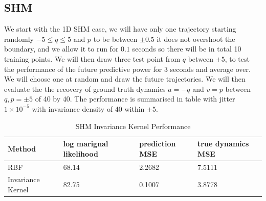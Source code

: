 \documentclass{statsmsc}
\begin{document}
\subsection{SHM}
We start with the 1D SHM case, we will have only one trajectory starting randomly $-5\le q\le5$ and $p$ to be between $\pm 0.5$ it does not overshoot the boundary, and we allow it to run for $0.1$ seconds so there will be in total 10 training points. 
We will then draw three test point from $q$ between $\pm 5$, to test the performance of the future predictive power for 3 seconds and average over. 
We will choose one at random and draw the future trajectories.
We will then evaluate the the recovery of ground truth dynamics $a=-q$ and $v=p$ between $q, p=\pm 5$ of 40 by 40.
The performance is summarised in table with jitter $1\times 10^{-5}$ with invariance density of 40 within $\pm 5$. 
\begin{table}[H]
  \centering
  \begin{tabular}{l l l l }
\hline
Method           & log marignal likelihood & prediction MSE &  true dynamics  MSE\\
                    \hline
RBF & 68.14 & 2.2682 & 7.5111 \\
Invariance Kernel & 82.75 & 0.1007 & 3.8778 \\
\hline
  \end{tabular}
  \caption{SHM Invariance Kernel Performance}
  \label{tab:shm_performance}
\end{table}
\end{document}
